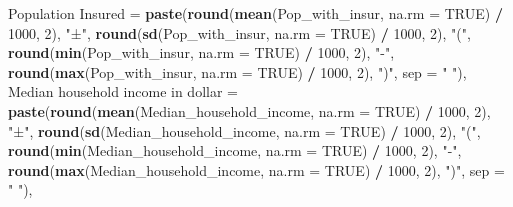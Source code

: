 \documentclass[
]{article}
\newenvironment{Shaded}{\begin{snugshade}}{\end{snugshade}}
\newcommand{\AttributeTok}[1]{\textcolor[rgb]{0.13,0.29,0.53}{#1}}
\newcommand{\ConstantTok}[1]{\textcolor[rgb]{0.56,0.35,0.01}{#1}}
\newcommand{\DecValTok}[1]{\textcolor[rgb]{0.00,0.00,0.81}{#1}}
\newcommand{\FunctionTok}[1]{\textcolor[rgb]{0.13,0.29,0.53}{\textbf{#1}}}
\newcommand{\NormalTok}[1]{#1}
\newcommand{\OtherTok}[1]{\textcolor[rgb]{0.56,0.35,0.01}{#1}}
\newcommand{\SpecialCharTok}[1]{\textcolor[rgb]{0.81,0.36,0.00}{\textbf{#1}}}
\newcommand{\StringTok}[1]{\textcolor[rgb]{0.31,0.60,0.02}{#1}}
\begin{document}
\begin{Shaded}
\begin{Highlighting}[]
    \StringTok{\textasciigrave{}}\AttributeTok{Population Insured}\StringTok{\textasciigrave{}} \OtherTok{=} \FunctionTok{paste}\NormalTok{(}\FunctionTok{round}\NormalTok{(}\FunctionTok{mean}\NormalTok{(Pop\_with\_insur, }\AttributeTok{na.rm =} \ConstantTok{TRUE}\NormalTok{) }\SpecialCharTok{/} \DecValTok{1000}\NormalTok{, }\DecValTok{2}\NormalTok{), }\StringTok{"±"}\NormalTok{, }\FunctionTok{round}\NormalTok{(}\FunctionTok{sd}\NormalTok{(Pop\_with\_insur, }\AttributeTok{na.rm =} \ConstantTok{TRUE}\NormalTok{) }\SpecialCharTok{/} \DecValTok{1000}\NormalTok{, }\DecValTok{2}\NormalTok{), }\StringTok{"("}\NormalTok{, }\FunctionTok{round}\NormalTok{(}\FunctionTok{min}\NormalTok{(Pop\_with\_insur, }\AttributeTok{na.rm =} \ConstantTok{TRUE}\NormalTok{) }\SpecialCharTok{/} \DecValTok{1000}\NormalTok{, }\DecValTok{2}\NormalTok{), }\StringTok{"{-}"}\NormalTok{, }\FunctionTok{round}\NormalTok{(}\FunctionTok{max}\NormalTok{(Pop\_with\_insur, }\AttributeTok{na.rm =} \ConstantTok{TRUE}\NormalTok{) }\SpecialCharTok{/} \DecValTok{1000}\NormalTok{, }\DecValTok{2}\NormalTok{), }\StringTok{")"}\NormalTok{, }\AttributeTok{sep =} \StringTok{" "}\NormalTok{),}
    \StringTok{\textasciigrave{}}\AttributeTok{Median household income in dollar}\StringTok{\textasciigrave{}} \OtherTok{=} \FunctionTok{paste}\NormalTok{(}\FunctionTok{round}\NormalTok{(}\FunctionTok{mean}\NormalTok{(Median\_household\_income, }\AttributeTok{na.rm =} \ConstantTok{TRUE}\NormalTok{) }\SpecialCharTok{/} \DecValTok{1000}\NormalTok{, }\DecValTok{2}\NormalTok{), }\StringTok{"±"}\NormalTok{, }\FunctionTok{round}\NormalTok{(}\FunctionTok{sd}\NormalTok{(Median\_household\_income, }\AttributeTok{na.rm =} \ConstantTok{TRUE}\NormalTok{) }\SpecialCharTok{/} \DecValTok{1000}\NormalTok{, }\DecValTok{2}\NormalTok{), }\StringTok{"("}\NormalTok{, }\FunctionTok{round}\NormalTok{(}\FunctionTok{min}\NormalTok{(Median\_household\_income, }\AttributeTok{na.rm =} \ConstantTok{TRUE}\NormalTok{) }\SpecialCharTok{/} \DecValTok{1000}\NormalTok{, }\DecValTok{2}\NormalTok{), }\StringTok{"{-}"}\NormalTok{, }\FunctionTok{round}\NormalTok{(}\FunctionTok{max}\NormalTok{(Median\_household\_income, }\AttributeTok{na.rm =} \ConstantTok{TRUE}\NormalTok{) }\SpecialCharTok{/} \DecValTok{1000}\NormalTok{, }\DecValTok{2}\NormalTok{), }\StringTok{")"}\NormalTok{, }\AttributeTok{sep =} \StringTok{" "}\NormalTok{),}

\end{Highlighting}
\end{Shaded}
\end{document}
